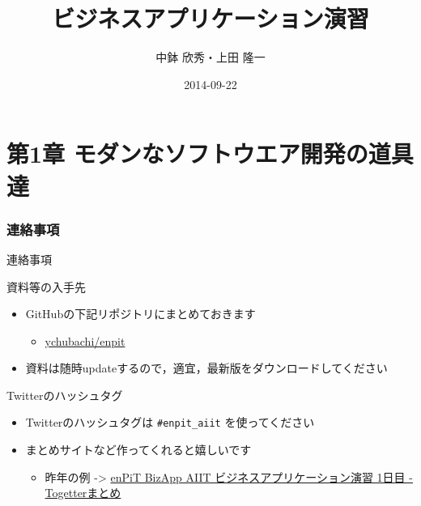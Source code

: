 \documentclass[t, aspectratio=169]{beamer}
\date{\insertpart}
\institute[AIIT]{産業技術大学院大学(AIIT)}
\author{中鉢 欣秀・上田 隆一}
\date{2014-09-22}
\title{ビジネスアプリケーション演習}
\begin{document}
\maketitle

\part{第1章 モダンなソフトウエア開発の道具達}
\label{sec-1}
\section{連絡事項}
\label{sec-1-1}
\begin{frame}[fragile,label=sec-1-1-1]{連絡事項}
 \begin{block}{資料等の入手先}
\begin{itemize}
\item GitHubの下記リポジトリにまとめておきます
\begin{itemize}
\item \href{https://github.com/ychubachi/enpit}{ychubachi/enpit}
\end{itemize}
\item 資料は随時updateするので，適宜，最新版をダウンロードしてください
\end{itemize}
\end{block}

\begin{block}{Twitterのハッシュタグ}
\begin{itemize}
\item Twitterのハッシュタグは \texttt{\#enpit\_aiit} を使ってください
\item まとめサイトなど作ってくれると嬉しいです
\begin{itemize}
\item 昨年の例 -> \href{http://togetter.com/li/558221}{enPiT BizApp AIIT ビジネスアプリケーション演習 1日目 - Togetterまとめ}
\end{itemize}
\end{itemize}
\end{block}
\end{frame}
\end{document}
